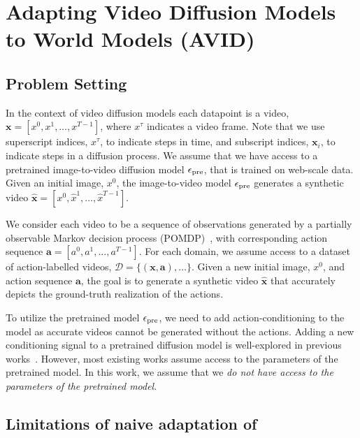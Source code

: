 \section{Adapting Video Diffusion Models to World Models (AVID)} \label{sec:methods}

\subsection{Problem Setting}

In the context of video diffusion models each datapoint is a video, $\mathbf{x} = [x^0, x^1, \ldots, x^{T-1}]$, where $x^\tau$ indicates a video frame. Note that we use superscript indices, $x^\tau$, to indicate steps in time, and subscript indices, $\mathbf{x}_i$, to indicate steps in a diffusion process. We assume that we have access to a pretrained image-to-video diffusion model $\epsilon_{\textnormal{pre}}$, that is trained on web-scale data. Given an initial image, $x^0$, the image-to-video model  $\epsilon_{\textnormal{pre}}$ generates a synthetic video $\hat{\mathbf{x}} = [x^0, \hat{x}^1, \ldots, \hat{x}^{T-1}]$. 

We consider each video to be a sequence of observations generated by a partially observable Markov decision process (POMDP)~\citep{kaelbling1998planning}, with corresponding action sequence $\mathbf{a} = [a^0, a^1, \ldots, a^{T-1}]$. For each domain, we assume access to a dataset of action-labelled videos, $\mathcal{D} = \{(\mathbf{x}, \mathbf{a}), \ldots\}$. Given a new initial image, $x^0$, and action sequence $\mathbf{a}$, the goal is to generate a synthetic video $\hat{\mathbf{x}}$ that accurately depicts the ground-truth realization of the actions.

To utilize the pretrained model $\epsilon_{\textnormal{pre}}$, we need to add action-conditioning to the model as accurate videos cannot be generated without the actions. Adding a new conditioning signal to a pretrained diffusion model is well-explored in previous works~\citep{zhang2023adding, mou2024t2i,mokady2023null}. However, most existing works assume access to the parameters of the pretrained model. In this work, we assume that we \textit{do not have access to the parameters of the pretrained model}.


\subsection{Limitations of naive adaptation of \cite{yang2024probabilistic}}
\label{sec:yang_limitations}

